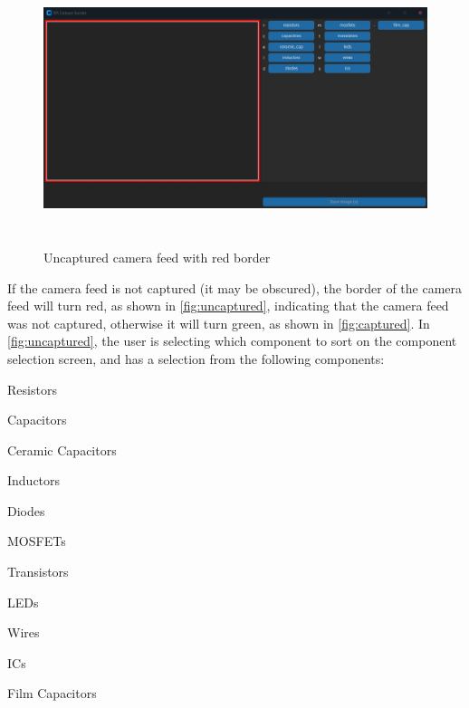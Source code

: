 \begin{figure}[H]
    \hfill
    \begin{minipage}[t]{\textwidth}
      \centering
      \includegraphics[height=8cm]{imgs/python/uncaptured.jpg}
      \caption{Uncaptured camera feed with red border}
        \label{fig:uncaptured}
    \end{minipage}
\end{figure}

If the camera feed is not captured (it may be obscured), the border of the camera feed will turn red, as shown in \autoref{fig:uncaptured}, indicating that the camera feed was not captured, otherwise it will turn green, as shown in \autoref{fig:captured}. In \autoref{fig:uncaptured}, the user is selecting which component to sort on the component selection screen, and has a selection from the following components: 
\begin{multicols}{2}
    \begin{mylist}
        
        \item Resistors
        \item Capacitors
        \item Ceramic Capacitors
        \item Inductors
        \item Diodes
        \item MOSFETs
        \item Transistors
        \item LEDs
        \item Wires
        \item ICs
        \item Film Capacitors
    \end{mylist}
\end{multicols}

